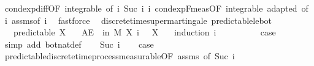 \begin{isabellebody}
\ cond{\isacharunderscore}{\kern0pt}exp{\isacharunderscore}{\kern0pt}diff{\isacharbrackleft}{\kern0pt}OF\ integrable{\isacharparenleft}{\kern0pt}{}{\isacharcomma}{\kern0pt}{}{\isacharparenright}{\kern0pt}{\isacharcomma}{\kern0pt}\ of\ i\ {\isachardoublequoteopen}Suc\ i{\isachardoublequoteclose}\ i{\isacharbrackright}{\kern0pt}\ cond{\isacharunderscore}{\kern0pt}exp{\isacharunderscore}{\kern0pt}F{\isacharunderscore}{\kern0pt}meas{\isacharbrackleft}{\kern0pt}OF\ integrable\ adapted{\isacharcomma}{\kern0pt}\ of\ i{\isacharbrackright}{\kern0pt}\ assms{\isacharparenleft}{\kern0pt}{}{\isacharparenright}{\kern0pt}{\isacharbrackleft}{\kern0pt}of\ i{\isacharbrackright}{\kern0pt}\ \isamarkupfalse%
\ fastforce\isanewline
{}\isamarkupfalse%
%
\endisatagproof
{\isafoldproof}%
%
\isadelimproof
%
\endisadelimproof
%
\isadelimdocument
%
\endisadelimdocument
%
\isatagdocument
%
\isamarkuptrue%
%
\endisatagdocument
{\isafolddocument}%
%
\isadelimdocument
%
\endisadelimdocument
{}\isamarkupfalse%
\ {\isacharparenleft}{\kern0pt}\ discrete{\isacharunderscore}{\kern0pt}time{\isacharunderscore}{\kern0pt}supermartingale{\isacharparenright}{\kern0pt}\ predictable{\isacharunderscore}{\kern0pt}le{\isacharunderscore}{\kern0pt}bot{\isacharcolon}{\kern0pt}\isanewline
\ \ \ {\isachardoublequoteopen}predictable\ X{\isachardoublequoteclose}\isanewline
\ \ \ {\isachardoublequoteopen}AE\ {\isasymxi}\ in\ M{\isachardot}{\kern0pt}\ X\ i\ {\isasymxi}\ {\isasymle}\ X\ {\isasymbottom}\ {\isasymxi}{\isachardoublequoteclose}\isanewline
%
\isadelimproof
%
\endisadelimproof
%
\isatagproof
{}\isamarkupfalse%
\ {\isacharparenleft}{\kern0pt}induction\ i{\isacharparenright}{\kern0pt}\isanewline
\ \ \isamarkupfalse%
\ {}\isanewline
\ \ \isamarkupfalse%
\ \isamarkupfalse%
\ {\isacharquery}{\kern0pt}case\ \isamarkupfalse%
\ {\isacharparenleft}{\kern0pt}simp\ add{\isacharcolon}{\kern0pt}\ bot{\isacharunderscore}{\kern0pt}nat{\isacharunderscore}{\kern0pt}def{\isacharparenright}{\kern0pt}\isanewline
{}\isamarkupfalse%
\isanewline
\ \ \isamarkupfalse%
\ {\isacharparenleft}{\kern0pt}Suc\ i{\isacharparenright}{\kern0pt}\isanewline
\ \ \isamarkupfalse%
\ {\isacharquery}{\kern0pt}case\ \isamarkupfalse%
\ predictable{\isacharunderscore}{\kern0pt}discrete{\isacharunderscore}{\kern0pt}time{\isacharunderscore}{\kern0pt}process{\isacharunderscore}{\kern0pt}measurable{\isacharbrackleft}{\kern0pt}OF\ assms{\isacharcomma}{\kern0pt}\ of\ {\isachardoublequoteopen}Suc\ i{\isachardoublequoteclose}{\isacharbrackright}{\kern0pt}\ \isanewline

\end{isabellebody}

